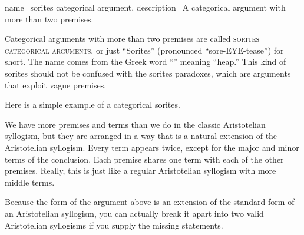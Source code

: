 {
name=sorites categorical argument,
description={A categorical argument with more than two premises.}
}

Categorical arguments with more than two premises are called \textsc{\glspl{sorites categorical argument}}, \label{def:sorites_categorical_arguments} or just ``Sorites'' (pronounced ``sore-EYE-tease'') for short. The name comes from the Greek word ``\textSigma\textomikron\textrho\textomikron\textvarsigma'' meaning ``heap.'' This kind of sorites should not be confused with the sorites paradoxes, which are arguments that exploit vague premises.

Here is a simple example of a categorical sorites.

\begin{kormanize}
\end{kormanize}

We have more premises and terms than we do in the classic Aristotelian syllogism, but they are arranged in a way that is a natural extension of the Aristotelian syllogism. Every term appears twice, except for the major and minor terms of the conclusion. Each premise shares one term with each of the other premises. Really, this is just like a regular Aristotelian syllogism with more middle terms.

Because the form of the argument above is an extension of the standard form of an Aristotelian syllogism, you can actually break it apart into two valid Aristotelian syllogisms if you supply the missing statements.



